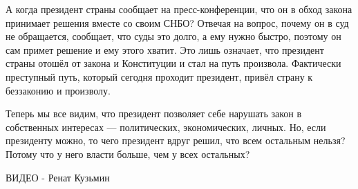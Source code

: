 А когда президент страны сообщает на пресс-конференции, что он в обход закона
принимает решения вместе со своим СНБО? Отвечая на вопрос, почему он в суд не
обращается, сообщает, что суды это долго, а ему нужно быстро, поэтому он сам
примет решение и ему этого хватит. Это лишь означает, что президент страны
отошёл от закона и Конституции и стал на путь произвола. Фактически преступный
путь, который сегодня проходит президент, привёл страну к беззаконию и
произволу. 

Теперь мы все видим, что президент позволяет себе нарушать закон в собственных
интересах — политических, экономических, личных. Но, если президенту можно, то
чего президент вдруг решил, что всем остальным нельзя? Потому что у него власти
больше, чем у всех остальных?

ВИДЕО - Ренат Кузьмин

